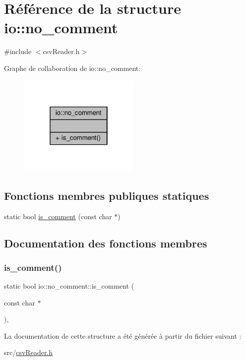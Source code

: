 \hypertarget{structio_1_1no__comment}{}\section{Référence de la structure io\+:\+:no\+\_\+comment}
\label{structio_1_1no__comment}


{\ttfamily \#include $<$csv\+Reader.\+h$>$}



Graphe de collaboration de io\+:\+:no\+\_\+comment\+:
\nopagebreak
\begin{figure}[H]
\begin{center}
\leavevmode
\includegraphics[width=166pt]{structio_1_1no__comment__coll__graph}
\end{center}
\end{figure}
\subsection*{Fonctions membres publiques statiques}
\begin{DoxyCompactItemize}
\item 
static bool \hyperlink{structio_1_1no__comment_a52b252547482e28edd076ee2224bc8d8}{is\+\_\+comment} (const char $\ast$)
\end{DoxyCompactItemize}


\subsection{Documentation des fonctions membres}
\mbox{\label{structio_1_1no__comment_a52b252547482e28edd076ee2224bc8d8}} 
\subsubsection{\texorpdfstring{is\+\_\+comment()}{is\_comment()}}
{\footnotesize\ttfamily static bool io\+::no\+\_\+comment\+::is\+\_\+comment (\begin{DoxyParamCaption}\item[{const char $\ast$}]{ }\end{DoxyParamCaption})\hspace{0.3cm}{\ttfamily [inline]}, {\ttfamily [static]}}



La documentation de cette structure a été générée à partir du fichier suivant \+:\begin{DoxyCompactItemize}
\item 
src/\hyperlink{csvReader_8h}{csv\+Reader.\+h}\end{DoxyCompactItemize}
